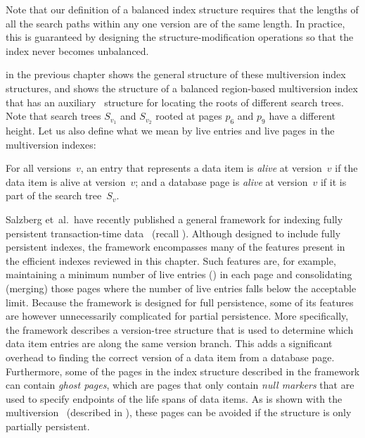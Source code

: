 Note that our definition of a balanced index structure requires that the
lengths of all the search paths within any one version are of the same
length. 
In practice, this is guaranteed by designing the structure-modification
operations so that the index never becomes unbalanced.

\begin{figure}[htb]
\begin{center}

\label{fig:mv-index-example}
\end{center}
\end{figure}

 in the previous chapter shows the
general structure of these multiversion index structures, and
 shows the structure of a balanced
region-based multiversion index that has an auxiliary \rootstar\ structure
for locating the roots of different search trees.
Note that search trees $S_{v_1}$ and $S_{v_2}$ rooted at pages $p_6$ and
$p_9$ have a different height. 
Let us also define what we mean by live entries and live pages in the
multiversion indexes:

\thmskip
\begin{definition}
\label{def:alive-entries-pages}
For all versions~$v$, an entry that represents a data item is \emph{alive} at
version~$v$ if the data item is alive at version~$v$; and a database page is
\emph{alive} at version~$v$ if it is part of the search
tree~$S_v$.
\end{definition}
\thmskip


Salzberg et~al.\ have recently published a general framework for indexing
fully persistent transaction-time data~\cite{salzberg:2004:framework} (recall 
). 
Although designed to include fully persistent indexes, the framework
encompasses many of the features present in the efficient indexes reviewed in
this chapter.
Such features are, for example, maintaining a minimum number of live entries
() in each page and consolidating (merging)
those pages where the number of live entries falls below the acceptable
limit.
Because the framework is designed for full persistence, some of its features
are however unnecessarily complicated for partial persistence.
More specifically, the framework describes a version-tree structure that is
used to determine which data item entries are along the same version branch.
This adds a significant overhead to finding the correct version of a data
item from a database page. 
Furthermore, some of the pages in the index structure described in the
framework can contain \emph{ghost pages}, which are pages that only contain
\emph{null markers} that are used to specify endpoints of the life spans
of data items.
As is shown with the multiversion \Btree\ (described in
), these pages can be avoided if the
structure is only partially persistent.


